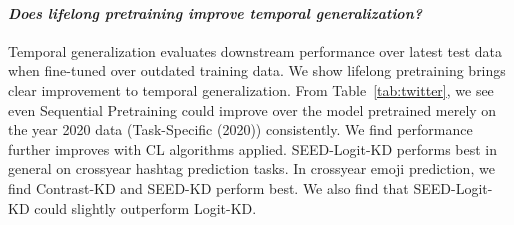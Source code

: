 \paragraph{\textit{Does lifelong pretraining improve temporal generalization?}} 
Temporal generalization evaluates downstream performance over latest test data when fine-tuned over outdated training data. 
We show lifelong pretraining brings clear improvement to temporal generalization.
From Table~\ref{tab:twitter}, we see even Sequential Pretraining could improve over the model pretrained merely on the year 2020 data (Task-Specific (2020)) consistently. We find performance further improves with CL algorithms applied. SEED-Logit-KD performs best in general on crossyear hashtag prediction tasks. %
In crossyear emoji prediction, we find Contrast-KD and SEED-KD perform best. We also find that SEED-Logit-KD could slightly outperform Logit-KD. %



%



